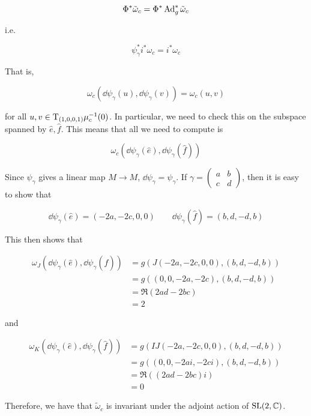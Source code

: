 \documentclass{article}
\begin{document}
\[\Phi^*\tilde\omega_c = \Phi^*\operatorname{Ad}_g^*\tilde\omega_c\]

i.e.

\[\psi_\gamma^*i^*\omega_c = i^*\omega_c\]

That is,

\[\omega_c(\dd\psi_\gamma(u), \dd\psi_\gamma(v)) = \omega_c(u, v)\]

for all \(u, v \in \mathrm{T}_{(1,0,0,1)}\mu_c^{-1}(0)\). In particular, we need to check this on the subspace spanned by \(\hat e, \hat f\). This means that all we need to compute is

\[\omega_c(\dd\psi_\gamma(\hat e), \dd\psi_\gamma(\hat f))\]

Since \(\psi_\gamma\) gives a linear map \(M \to M\), \(\dd\psi_\gamma = \psi_\gamma\). If \(\gamma = \begin{pmatrix}
    a & b \\ c & d
\end{pmatrix}\), then it is easy to show that

\[\dd\psi_\gamma(\hat e) = (-2a, -2c, 0, 0) \qquad \dd\psi_\gamma(\hat f) = (b, d, -d, b)\]

This then shows that

\begin{align*}
    \omega_J(\dd\psi_\gamma(\hat e), \dd\psi_\gamma(\hat f)) &= g(J(-2a, -2c, 0, 0), (b, d, -d, b)) \\
    &= g((0, 0, -2a, -2c), (b, d, -d, b)) \\
    &= \Re(2ad - 2bc) \\
    &= 2
\end{align*}

and

\begin{align*}
    \omega_K(\dd\psi_\gamma(\hat e), \dd\psi_\gamma(\hat f)) &= g(IJ(-2a, -2c, 0, 0), (b, d, -d, b)) \\
    &= g((0, 0, -2ai, -2ci), (b, d, -d, b)) \\
    &= \Re((2ad - 2bc)i) \\
    &= 0
\end{align*}

Therefore, we have that \(\tilde\omega_c\) is invariant under the adjoint action of \(\operatorname{SL}(2, \mathbb{C})\).

\printbibliography
\end{document}
